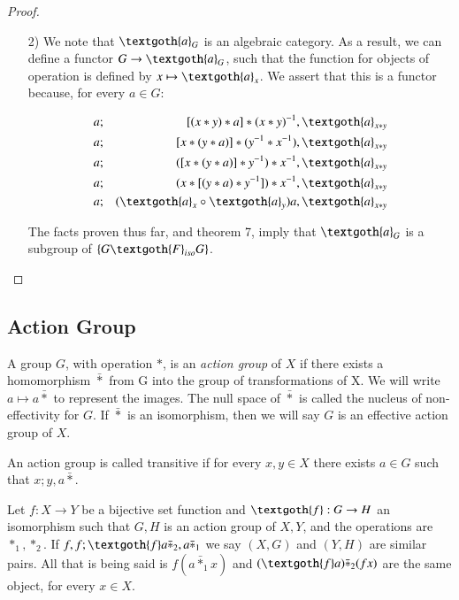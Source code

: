 \documentclass [12pt]{book}
\begin{document}
\begin{proof}
\begin{itemize}
\item[2)] We note that $\textgoth{a}_{G}$ is an algebraic category. As a result, we can define a functor $G\rightarrow\textgoth{a}_{G}$, such that the function for objects of operation is defined by $x\mapsto\textgoth{a}_{x}$. We assert that this is a functor because, for every $a\in G$:

\begin{eqnarray}\nonumber a&;&[(x*y)*a]*(x*y)^{-1},\textgoth{a}_{x*y}\\\nonumber a&;&[x*(y*a)]*(y^{-1}*x^{-1}),\textgoth{a}_{x*y}\\\nonumber a&;&([x*(y*a)]*y^{-1})*x^{-1},\textgoth{a}_{x*y}\\\nonumber a&;&(x*[(y*a)*y^{-1}])*x^{-1},\textgoth{a}_{x*y}\\\nonumber a&;&(\textgoth{a}_{x}\circ\textgoth{a}_{y})a,\textgoth{a}_{x*y}\end{eqnarray}

 The facts proven thus far, and theorem 7, imply that $\textgoth{a}_{G}$ is a subgroup of $\{G\textgoth{F}_{iso}G\}$.
\end{itemize}\end{proof}

	\subsection{Action Group}

\begin{definition}A group $G$, with operation $*$, is an \textit{action group} of $X$ if there exists a homomorphism $\bar{*}$ from G into the group of transformations of X. We will write $a\mapsto a\bar{*}$ to represent the images. The null space of $\bar*$ is called the nucleus of non-effectivity for $G$. If $\bar{*}$ is an isomorphism, then we will say $G$ is an effective action group of $X$.

An action group is called transitive if for every $x,y\in X$ there exists $a\in G$ such that $x;y,a\bar*$.

Let $f:X\rightarrow Y$ be a bijective set function and $\textgoth{f}:G\rightarrow H$ an isomorphism such that $G,H$ is an action group of $X,Y$, and the operations are $*_1,*_2$. If $f,f;\textgoth{f}a\bar{*}_2,a\bar*_1$ we say $(X,G)$ and $(Y,H)$ are similar pairs. All that is being said is $f(a\bar*_1x)$ and $(\textgoth{f}a)\bar*_2(fx)$ are the same object, for every $x\in X$.

\end{definition}
\end{document}
